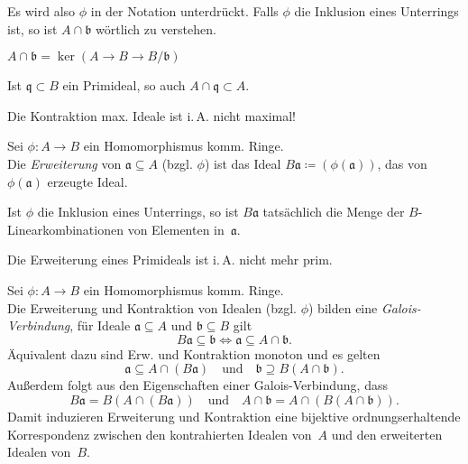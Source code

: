 \documentclass{cheat-sheet}
\newcommand{\aaa}{\mathfrak{a}}
\newcommand{\bbb}{\mathfrak{b}}
\newcommand{\qqq}{\mathfrak{q}}
\newcommand{\mmm}{\mathfrak{m}}
\begin{document}
\begin{bem}
  Es wird also $\phi$ in der Notation unterdrückt.
  Falls $\phi$ die Inklusion eines Unterrings ist, so ist $A \cap \bbb$ wörtlich zu verstehen.
\end{bem}

\begin{beob}
  $A \cap \bbb = \ker(A \to B \to B/\bbb)$
\end{beob}

\begin{lem}
  Ist $\qqq \subset B$ ein Primideal, so auch $A \cap \qqq \subset A$.
\end{lem}

\begin{acht}
  Die Kontraktion max. Ideale ist i.\,A. nicht maximal!
\end{acht}



\begin{defn}
  Sei $\phi : A \to B$ ein Homomorphismus komm. Ringe. \\
  Die \emph{Erweiterung} von $\aaa \subseteq A$ (bzgl. $\phi$) ist das Ideal $B \aaa \coloneqq (\phi(\aaa))$, das von $\phi(\aaa)$ erzeugte Ideal.
\end{defn}

\begin{bem}
  Ist $\phi$ die Inklusion eines Unterrings, so ist $B \aaa$ tatsächlich die Menge der $B$-Linearkombinationen von Elementen in~$\aaa$.
\end{bem}

\begin{bem}
  Die Erweiterung eines Primideals ist i.\,A. nicht mehr prim.
\end{bem}


\begin{prop}
  Sei $\phi : A \to B$ ein Homomorphismus komm. Ringe. \\
  Die Erweiterung und Kontraktion von Idealen (bzgl. $\phi$) bilden eine \textit{Galois-Verbindung}, \dh{} für Ideale $\aaa \subseteq A$ und $\bbb \subseteq B$ gilt
  \[
    B \aaa \subseteq \bbb \iff \aaa \subseteq A \cap \bbb.
  \]
  Äquivalent dazu sind Erw. und Kontraktion monoton und es gelten
  \[
    \aaa \subseteq A \cap (B \aaa)
    \quad \text{und} \quad
    \bbb \supseteq B (A \cap \bbb).
  \]
  Außerdem folgt aus den Eigenschaften einer Galois-Verbindung, dass
  \[
    B \aaa = B (A \cap (B \aaa))
    \quad \text{und} \quad
    A \cap \bbb = A \cap (B (A \cap \bbb)).
  \]
  Damit induzieren Erweiterung und Kontraktion eine bijektive ordnungserhaltende Korrespondenz zwischen den kontrahierten Idealen von~$A$ und den erweiterten Idealen von~$B$.
\end{prop}
\end{document}
